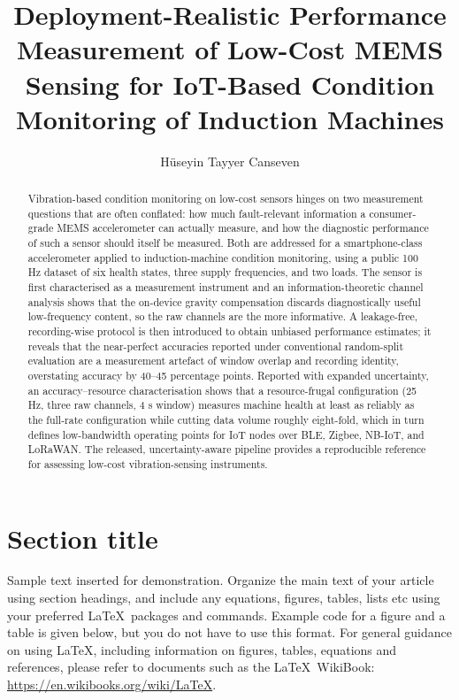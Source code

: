 \documentclass[anonymous]{iopjournal}
\begin{document}

\title{Deployment-Realistic Performance Measurement of Low-Cost MEMS Sensing for IoT-Based Condition Monitoring of Induction Machines}

\author{H{\"u}seyin Tayyer Canseven}




\begin{abstract}
Vibration-based condition monitoring on low-cost sensors hinges on two measurement questions that are often conflated: how much fault-relevant information a consumer-grade MEMS accelerometer can actually measure, and how the diagnostic performance of such a sensor should itself be measured. Both are addressed for a smartphone-class accelerometer applied to induction-machine condition monitoring, using a public 100 Hz dataset of six health states, three supply frequencies, and two loads. The sensor is first characterised as a measurement instrument and an information-theoretic channel analysis shows that the on-device gravity compensation discards diagnostically useful low-frequency content, so the raw channels are the more informative. A leakage-free, recording-wise protocol is then introduced to obtain unbiased performance estimates; it reveals that the near-perfect accuracies reported under conventional random-split evaluation are a measurement artefact of window overlap and recording identity, overstating accuracy by 40–45 percentage points. Reported with expanded uncertainty, an accuracy–resource characterisation shows that a resource-frugal configuration (25 Hz, three raw channels, 4 s window) measures machine health at least as reliably as the full-rate configuration while cutting data volume roughly eight-fold, which in turn defines low-bandwidth operating points for IoT nodes over BLE, Zigbee, NB-IoT, and LoRaWAN. The released, uncertainty-aware pipeline provides a reproducible reference for assessing low-cost vibration-sensing instruments.
\end{abstract}

\section{Section title}
Sample text inserted for demonstration. Organize the main text of your article using section headings, and include any equations, figures, tables, lists etc using your preferred \LaTeX\ packages and commands. Example code for a figure and a table is given below, but you do not have to use this format. For general guidance on using \LaTeX , including information on figures, tables, equations and references, please refer to documents such as the \LaTeX\ WikiBook: \href{https://en.wikibooks.org/wiki/LaTeX}{https://en.wikibooks.org/wiki/LaTeX}.
\end{document}
